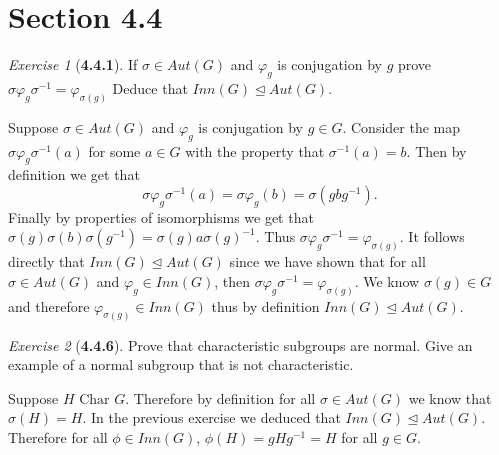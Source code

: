 \documentclass[12pt]{amsart}
\makeatletter
\theoremstyle{remark}
\newtheorem*{exercise}{Exercise}%
\renewenvironment{proof}[1][\proofname]{\par\doublespacing
  \pushQED{\qed}%
  \normalfont \topsep6\p@\@plus6\p@\relax
  \list{}{%
    \settowidth{\leftmargin}{\itshape\proofname:\hskip\labelsep}%
    \setlength{\labelwidth}{0pt}%
    \setlength{\itemindent}{-\leftmargin}%
  }%
  \item[\hskip\labelsep\itshape#1\@addpunct{:}]\ignorespaces
}{%
  \popQED\endlist\@endpefalse
  \singlespacing
}
\theoremstyle{mycomment}
\makeatother
\begin{document}
\thispagestyle{fancy}
\author{Coordinator: Coordinator's Name}

%  
%  
%  


\section*{\textbf{Section 4.4}}

\begin{exercise}[\textbf{4.4.1}] If $\sigma \in Aut(G)$ and $\varphi_g$ is conjugation by $g$ prove $\sigma \varphi_g \sigma^{-1} = \varphi_{\sigma(g)}$ 
  Deduce that $Inn(G) \trianglelefteq Aut(G)$. 
  \begin{proof} Suppose $\sigma \in Aut(G)$ and $\varphi_g$ is conjugation by $g \in G$. Consider the map $\sigma \varphi_g \sigma^{-1}(a)$ for some $a \in G$ with 
    the property that $\sigma^{-1}(a) = b$. Then by definition we get that 
    \begin{equation*}
      \sigma \varphi_g \sigma^{-1}(a) = \sigma \varphi_g(b) = \sigma(gbg^{-1}).
    \end{equation*}
    Finally by properties of isomorphisms we get that $\sigma(g)\sigma(b)\sigma(g^{-1}) = \sigma(g)a\sigma(g)^{-1}$. Thus $\sigma \varphi_g \sigma^{-1} = \varphi_{\sigma(g)}$.
    It follows directly that $Inn(G) \trianglelefteq Aut(G)$ since we have shown that for all $\sigma \in Aut(G)$ and $\varphi_g \in Inn(G)$, then $\sigma \varphi_g \sigma^{-1} = \varphi_{\sigma(g)}$. 
    We know $\sigma(g) \in G$ and therefore $\varphi_{\sigma(g)} \in Inn(G)$ thus by definition $Inn(G) \trianglelefteq Aut(G)$. 
  \end{proof}
\end{exercise}
\vspace{.15in}


\begin{exercise}[\textbf{4.4.6}] Prove that characteristic subgroups are normal. Give an example of a normal subgroup that is not characteristic. 
  \begin{proof} Suppose $H \text{ Char } G$. Therefore by definition for all $\sigma \in Aut(G)$ we know that $\sigma(H) = H$. In the previous exercise
    we deduced that $Inn(G) \trianglelefteq Aut(G)$. Therefore for all $\phi \in Inn(G)$, $\phi(H) = gHg^{-1} = H$ for all $g\in G$.
  \end{proof}
\end{exercise}
\vspace{.15in}
\end{document}
